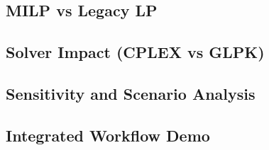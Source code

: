 \subsection{MILP vs Legacy LP}

\subsection{Solver Impact (CPLEX vs GLPK)}

\subsection{Sensitivity and Scenario Analysis}

\subsection{Integrated Workflow Demo}

\newpage 
